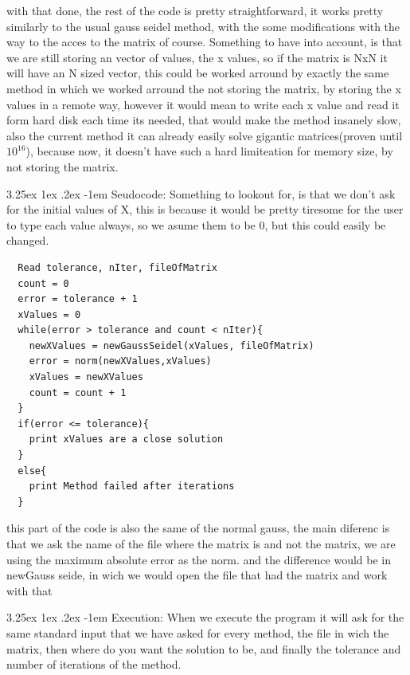 \documentclass{article}
\makeatletter
\renewcommand\paragraph{\@startsection{paragraph}{5}{\z@}%
  {3.25ex \@plus1ex \@minus.2ex}%
  {-1em}%
  {\normalfont\normalsize\bfseries}}
\makeatother
\begin{document}
with that done, the rest of the code is pretty straightforward, it works pretty similarly to the usual gauss seidel method, with the some modifications with the way
to the acces to the matrix of course. Something to have into account, is that we are still storing an vector of values, the x values, so if the matrix is NxN
it will have an N sized vector, this could be worked arround by exactly the same method in which we worked arround the not storing the matrix, by storing the x values in a remote way, however it would mean to
write each x value and read it form hard disk each time its needed, that would make the method insanely slow, also the current method it can already easily solve
gigantic matrices(proven until $10^{16}$), because now, it doesn't have such a hard limiteation for memory size, by not storing the
matrix.

\paragraph{Seudocode:}
\hfill \break
Something to lookout for, is that we don't ask for the initial values of X, this is because it
would be pretty tiresome for the user to type each value always, so we asume them to be 0, but
this could easily be changed.


\begin{lstlisting}
  Read tolerance, nIter, fileOfMatrix
  count = 0
  error = tolerance + 1
  xValues = 0 
  while(error > tolerance and count < nIter){
    newXValues = newGaussSeidel(xValues, fileOfMatrix)
    error = norm(newXValues,xValues)
    xValues = newXValues
    count = count + 1
  }
  if(error <= tolerance){
    print xValues are a close solution
  }
  else{
    print Method failed after iterations
  }
\end{lstlisting}

this part of the code is also the same of the normal gauss, the main diferenc is that we ask the name of the file where the matrix is
and not the matrix, we are using the maximum absolute error as the norm. and the difference would be in newGauss seide, in wich we would
open the file that had the matrix and work with that


\paragraph{Execution:}
\hfill \break
When we execute the program it will ask for the same standard input that we have asked for every method, the file in wich the matrix,
then where do you want the solution to be, and finally the tolerance and number of iterations of the method.
\end{document}

